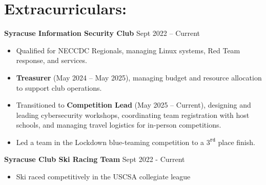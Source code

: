 \section*{Extracurriculars:}
\textbf{Syracuse Information Security Club} \hfill Sept 2022 – Current \\
\vspace{-9pt}
\begin{itemize}
	\item Qualified for NECCDC Regionals, managing Linux systems, Red Team response, and services.  
	\item \textbf{Treasurer} (May 2024 – May 2025), managing budget and resource allocation to support club operations.  
	\item Transitioned to \textbf{Competition Lead} (May 2025 – Current), designing and leading cybersecurity workshops, coordinating team registration with host schools, and managing travel logistics for in-person competitions.  
	\item Led a team in the Lockdown blue-teaming competition to a $3^{\texttt{rd}}$ place finish.  
\end{itemize}

\vspace{-7pt}

\textbf{Syracuse Club Ski Racing Team} \hfill Sept 2022 - Current\\
\vspace{-9pt}
\begin{itemize}
	\item Ski raced competitively in the USCSA collegiate league
\end{itemize}
\vspace{-25pt}
%



\vspace{-18.5pt}

